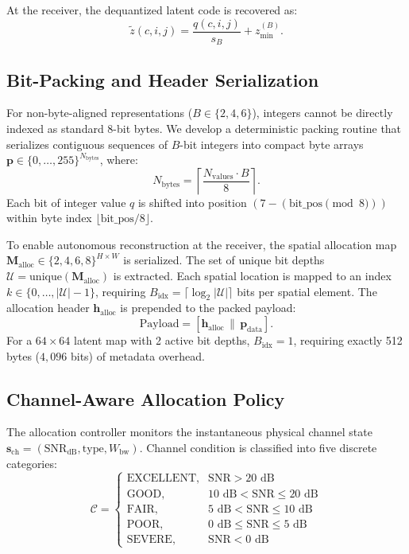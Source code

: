 \documentclass[journal,twocolumn]{IEEEtran}
\begin{document}
At the receiver, the dequantized latent code is recovered as:
\begin{equation}
\tilde{z}(c,i,j) = \frac{q(c,i,j)}{s_B} + z_{\min}^{(B)}.
\label{eq:dequantize}
\end{equation}

\subsection{Bit-Packing and Header Serialization}
For non-byte-aligned representations ($B \in \{2, 4, 6\}$), integers cannot be directly indexed as standard 8-bit bytes. We develop a deterministic packing routine that serializes contiguous sequences of $B$-bit integers into compact byte arrays $\mathbf{p} \in \{0, \dots, 255\}^{N_{\text{bytes}}}$, where:
\begin{equation}
N_{\text{bytes}} = \left\lceil \frac{N_{\text{values}} \cdot B}{8} \right\rceil.
\label{eq:packed_bytes_count}
\end{equation}
Each bit of integer value $q$ is shifted into position $(7 - (\text{bit\_pos} \pmod 8))$ within byte index $\lfloor \text{bit\_pos} / 8 \rfloor$.

To enable autonomous reconstruction at the receiver, the spatial allocation map $\mathbf{M}_{\text{alloc}} \in \{2, 4, 6, 8\}^{H \times W}$ is serialized. The set of unique bit depths $\mathcal{U} = \text{unique}(\mathbf{M}_{\text{alloc}})$ is extracted. Each spatial location is mapped to an index $k \in \{0, \dots, |\mathcal{U}|-1\}$, requiring $B_{\text{idx}} = \lceil \log_2 |\mathcal{U}| \rceil$ bits per spatial element. The allocation header $\mathbf{h}_{\text{alloc}}$ is prepended to the packed payload:
\begin{equation}
\text{Payload} = [\mathbf{h}_{\text{alloc}} \,\|\, \mathbf{p}_{\text{data}}].
\label{eq:payload_concatenation}
\end{equation}
For a $64\times 64$ latent map with 2 active bit depths, $B_{\text{idx}} = 1$, requiring exactly 512 bytes ($4,096$ bits) of metadata overhead.

\subsection{Channel-Aware Allocation Policy}
The allocation controller monitors the instantaneous physical channel state $\mathbf{s}_{\text{ch}} = (\text{SNR}_{\text{dB}}, \text{type}, W_{\text{bw}})$. Channel condition is classified into five discrete categories:
\begin{equation}
\mathcal{C} = \begin{cases}
\text{EXCELLENT}, & \text{SNR} > 20\text{ dB} \\
\text{GOOD}, & 10\text{ dB} < \text{SNR} \le 20\text{ dB} \\
\text{FAIR}, & 5\text{ dB} < \text{SNR} \le 10\text{ dB} \\
\text{POOR}, & 0\text{ dB} \le \text{SNR} \le 5\text{ dB} \\
\text{SEVERE}, & \text{SNR} < 0\text{ dB}
\end{cases}
\label{eq:channel_classification}
\end{equation}
\end{document}
